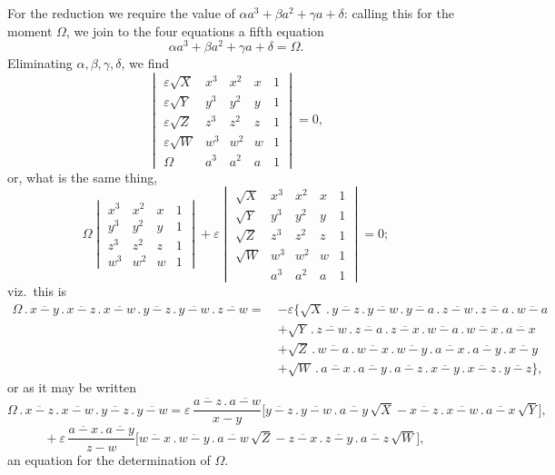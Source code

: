 \documentclass[11pt]{article}
\begin{document}
For the reduction we require the value of $\alpha a^3 + \beta a^2 + \gamma a + \delta$: calling this for the moment $\Omega$, we join to the four equations a fifth equation
\[
\alpha a^3 + \beta a^2 + \gamma a + \delta = \Omega.
\]
Eliminating $\alpha,\beta,\gamma,\delta$, we find
\[
\begin{vmatrix} \varepsilon\sqrt{X} & x^3 & x^2 & x & 1 \\ \varepsilon\sqrt{Y} & y^3 & y^2 & y & 1 \\ \varepsilon\sqrt{Z} & z^3 & z^2 & z & 1 \\ \varepsilon\sqrt{W} & w^3 & w^2 & w & 1 \\ \Omega & a^3 & a^2 & a & 1 \end{vmatrix} = 0,
\]
or, what is the same thing,
\[
\Omega\begin{vmatrix} x^3 & x^2 & x & 1 \\ y^3 & y^2 & y & 1 \\ z^3 & z^2 & z & 1 \\ w^3 & w^2 & w & 1 \end{vmatrix} + \varepsilon \begin{vmatrix} \sqrt{X} & x^3 & x^2 & x & 1 \\ \sqrt{Y} & y^3 & y^2 & y & 1 \\ \sqrt{Z} & z^3 & z^2 & z & 1 \\ \sqrt{W} & w^3 & w^2 & w & 1 \\ & a^3 & a^2 & a & 1 \end{vmatrix} = 0;
\]
viz.\ this is
\begin{align*}
\Omega\mathbin{.}\overline{x-y}\mathbin{.}\overline{x-z}\mathbin{.}\overline{x-w}\mathbin{.}\overline{y-z}\mathbin{.}\overline{y-w}\mathbin{.}\overline{z-w} =\ &-\varepsilon\bigl\{\sqrt{X}\mathbin{.}\overline{y-z}\mathbin{.}\overline{y-w}\mathbin{.}\overline{y-a}\mathbin{.}\overline{z-w}\mathbin{.}\overline{z-a}\mathbin{.}\overline{w-a}\\
&+ \sqrt{Y}\mathbin{.}\overline{z-w}\mathbin{.}\overline{z-a}\mathbin{.}\overline{z-x}\mathbin{.}\overline{w-a}\mathbin{.}\overline{w-x}\mathbin{.}\overline{a-x}\\
&+ \sqrt{Z}\mathbin{.}\overline{w-a}\mathbin{.}\overline{w-x}\mathbin{.}\overline{w-y}\mathbin{.}\overline{a-x}\mathbin{.}\overline{a-y}\mathbin{.}\overline{x-y}\\
&+ \sqrt{W}\mathbin{.}\overline{a-x}\mathbin{.}\overline{a-y}\mathbin{.}\overline{a-z}\mathbin{.}\overline{x-y}\mathbin{.}\overline{x-z}\mathbin{.}\overline{y-z}\bigr\},
\end{align*}
or as it may be written
\[
\Omega\mathbin{.}\overline{x-z}\mathbin{.}\overline{x-w}\mathbin{.}\overline{y-z}\mathbin{.}\overline{y-w} = \varepsilon\,\dfrac{\overline{a-z}\mathbin{.}\overline{a-w}}{x-y}\bigl[\overline{y-z}\mathbin{.}\overline{y-w}\mathbin{.}\overline{a-y}\,\sqrt{X} - \overline{x-z}\mathbin{.}\overline{x-w}\mathbin{.}\overline{a-x}\,\sqrt{Y}\bigr],
\]
\[
+\ \varepsilon\,\dfrac{\overline{a-x}\mathbin{.}\overline{a-y}}{z-w}\bigl[\overline{w-x}\mathbin{.}\overline{w-y}\mathbin{.}\overline{a-w}\,\sqrt{Z} - \overline{z-x}\mathbin{.}\overline{z-y}\mathbin{.}\overline{a-z}\,\sqrt{W}\bigr],
\]
an equation for the determination of $\Omega$.
\end{document}
